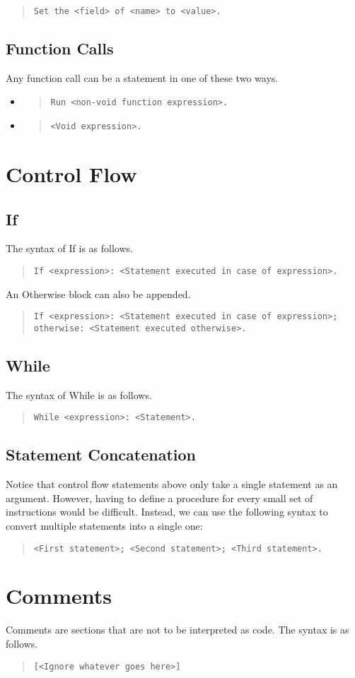 \documentclass{article}
\newcommand{\code}[1]{\texttt{#1}}
\newcommand{\codeblock}[1]{\begin{quote}\code{#1}\end{quote}}
\begin{document}
\codeblock{Set the <field> of <name> to <value>.}

\subsection{Function Calls}
Any function call can be a statement in one of these two ways.

\begin{itemize}
\item \codeblock {Run <non-void function expression>.}
\item \codeblock {<Void expression>.}
\end{itemize}

\section{Control Flow}
\subsection{If}
The syntax of If is as follows.
\codeblock{If <expression>: <Statement executed in case of expression>.}
An Otherwise block can also be appended.
\codeblock{If <expression>: <Statement executed in case of expression>; otherwise: <Statement executed otherwise>.}
\subsection{While}
The syntax of While is as follows.
\codeblock{While <expression>: <Statement>.}
\subsection{Statement Concatenation}
Notice that control flow statements above only take a single statement as an argument. However, having to define a procedure for every small set of instructions would be difficult. Instead, we can use the following syntax to convert multiple statements into a single one:
\codeblock{<First statement>; <Second statement>; <Third statement>.}
\section{Comments}
Comments are sections that are not to be interpreted as code. The syntax is as follows.
\codeblock{[<Ignore whatever goes here>]}
\end{document}
